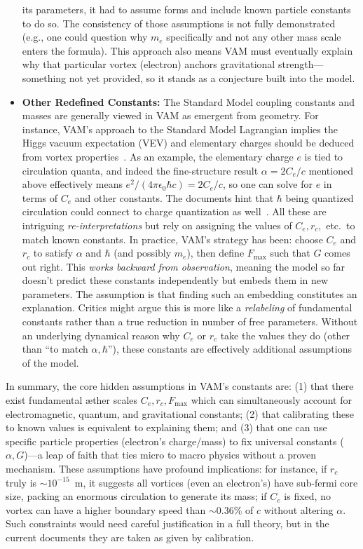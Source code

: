 \documentclass[a4paper,12pt]{article}
\begin{document}
\begin{itemize}
its parameters, it had to assume forms and include known particle constants to do so. The consistency of those assumptions is not fully demonstrated (e.g., one could question why $m_e$ specifically and not any other mass scale enters the formula). This approach also means VAM must eventually explain why that particular vortex (electron) anchors gravitational strength---something not yet provided, so it stands as a conjecture built into the model.

\item 
\textbf{Other Redefined Constants:} The Standard Model coupling constants and masses are generally viewed in VAM as emergent from geometry. For instance, VAM's approach to the Standard Model Lagrangian implies the Higgs vacuum expectation (VEV) and elementary charges should be deduced from vortex properties~\cite{vamcore}. As an example, the elementary charge $e$ is tied to circulation quanta, and indeed the fine-structure result $\alpha=2C_e/c$ mentioned above effectively means $e^2/(4\pi\epsilon_0\hbar c) = 2C_e/c$, so one can solve for $e$ in terms of $C_e$ and other constants. The documents hint that $\hbar$ being quantized circulation could connect to charge quantization as well~\cite{vamcore}. All these are intriguing \textit{re-interpretations} but rely on assigning the values of $C_e, r_c,$ etc.\ to match known constants. In practice, VAM's strategy has been: choose $C_e$ and $r_c$ to satisfy $\alpha$ and $\hbar$ (and possibly $m_e$), then define $F_{\max}$ such that $G$ comes out right. This \textit{works backward from observation}, meaning the model so far doesn't predict these constants independently but embeds them in new parameters. The assumption is that finding such an embedding constitutes an explanation. Critics might argue this is more like a \textit{relabeling} of fundamental constants rather than a true reduction in number of free parameters. Without an underlying dynamical reason why $C_e$ or $r_c$ take the values they do (other than ``to match $\alpha,\hbar$''), these constants are effectively additional assumptions of the model.
\end{itemize}

In summary, the core hidden assumptions in VAM's constants are: (1) that there exist fundamental æther scales $C_e, r_c, F_{\max}$ which can simultaneously account for electromagnetic, quantum, and gravitational constants; (2) that calibrating these to known values is equivalent to explaining them; and (3) that one can use specific particle properties (electron's charge/mass) to fix universal constants ($\alpha, G$)---a leap of faith that ties micro to macro physics without a proven mechanism. These assumptions have profound implications: for instance, if $r_c$ truly is $\sim10^{-15}$~m, it suggests all vortices (even an electron's) have sub-fermi core size, packing an enormous circulation to generate its mass; if $C_e$ is fixed, no vortex can have a higher boundary speed than $\sim0.36\%$ of $c$ without altering $\alpha$. Such constraints would need careful justification in a full theory, but in the current documents they are taken as given by calibration.
\end{document}

